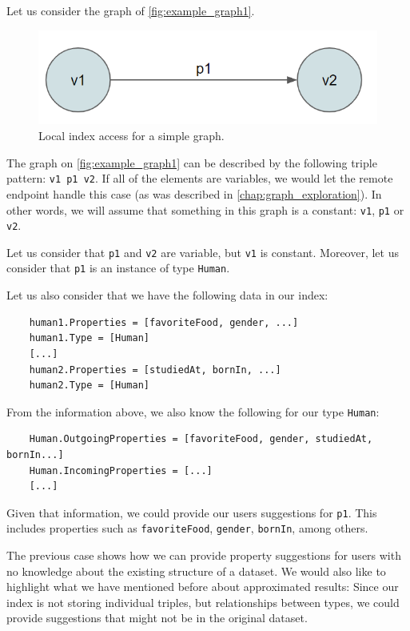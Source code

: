 \begin{example}
Let us consider the graph of \autoref{fig:example_graph1}.

\begin{figure}[H]
    \centering
        \includegraphics[width=0.5\linewidth]{imagenes/graph1.png}
        \caption{Local index access for a simple graph.}
        \label{fig:example_graph1}
\end{figure}

The graph on \autoref{fig:example_graph1} can be described by the following triple pattern: \texttt{v1 p1 v2}. If all of the elements are variables, we would let the remote endpoint handle this case (as was described in \autoref{chap:graph_exploration}). In other words, we will assume that something in this graph is a constant: \texttt{v1}, \texttt{p1} or \texttt{v2}.

Let us consider that \texttt{p1} and \texttt{v2} are variable, but \texttt{v1} is constant. Moreover, let us consider that \texttt{p1} is an instance of type \texttt{Human}.

Let us also consider that we have the following data in our index:
\begin{verbatim}
    human1.Properties = [favoriteFood, gender, ...]
    human1.Type = [Human]
    [...]
    human2.Properties = [studiedAt, bornIn, ...]
    human2.Type = [Human]
\end{verbatim}

From the information above, we also know the following for our type \texttt{Human}:
\begin{verbatim}
    Human.OutgoingProperties = [favoriteFood, gender, studiedAt, bornIn...]
    Human.IncomingProperties = [...]
    [...]
\end{verbatim}

Given that information, we could provide our users suggestions for \texttt{p1}. This includes properties such as \texttt{favoriteFood}, \texttt{gender}, \texttt{bornIn}, among others.

\end{example}

The previous case shows how we can provide property suggestions for users with no knowledge about the existing structure of a dataset. We would also like to highlight what we have mentioned before about approximated results: Since our index is not storing individual triples, but relationships between types, we could provide suggestions that might not be in the original dataset.

